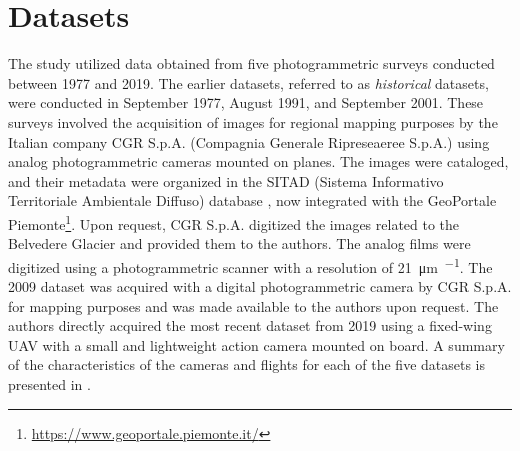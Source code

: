 

\section{Datasets}\label{sec:2:datasets}

The study utilized data obtained from five photogrammetric surveys conducted between 1977 and 2019. The earlier datasets, referred to as \textit{historical} datasets, were conducted in September 1977, August 1991, and September 2001. 
These surveys involved the acquisition of images for regional mapping purposes by the Italian company CGR S.p.A. (Compagnia Generale Ripreseaeree S.p.A.) using analog photogrammetric cameras mounted on planes. 
The images were cataloged, and their metadata were organized in the SITAD (Sistema Informativo Territoriale Ambientale Diffuso) database \citep{Cipriano2005_SITAD}, now integrated with the GeoPortale Piemonte\footnote{\url{ https://www.geoportale.piemonte.it/}}.
Upon request, CGR S.p.A. digitized the images related to the Belvedere Glacier and provided them to the authors. 
The analog films were digitized using a photogrammetric scanner with a resolution of \SI{21}{\micro\meter\per\pixel}. 
The 2009 dataset was acquired with a digital photogrammetric camera by CGR S.p.A. for mapping purposes and was made available to the authors upon request.
The authors directly acquired the most recent dataset from 2019 using a fixed-wing UAV with a small and lightweight action camera mounted on board.
A summary of the characteristics of the cameras and flights for each of the five datasets is presented in .

